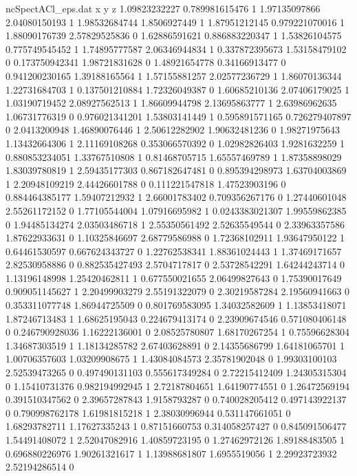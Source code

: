\begin{filecontents}{ncSpectACl_eps.dat}
x y z
1.09823232227 0.789981615476 1
1.97135097866 2.04080150193 1
1.98532684744 1.8506927449 1
1.87951212145 0.979221070016 1
1.88090176739 2.57829525836 0
1.62886591621 0.886883220347 1
1.53826104575 0.775749545452 1
1.74895777587 2.06346944834 1
0.337872395673 1.53158479102 0
0.173750942341 1.98721831628 0
1.48921654778 0.34166913477 0
0.941200230165 1.39188165564 1
1.57155881257 2.02577236729 1
1.86070136344 1.22731684703 1
0.137501210884 1.72326049387 0
1.60685210136 2.07406179025 1
1.03190719452 2.08927562513 1
1.86609944798 2.13695863777 1
2.63986962635 1.06731776319 0
0.976021341201 1.53803141449 1
0.595891571165 0.726279407897 0
2.0413200948 1.46890076446 1
2.50612282902 1.90632481236 0
1.98271975643 1.13432664306 1
2.11169108268 0.353066570392 0
1.02982826403 1.9281632259 1
0.880853234051 1.33767510808 1
0.81468705715 1.65557469789 1
1.87358898029 1.83039780819 1
2.59435177303 0.867182647481 0
0.895394298973 1.63704003869 1
2.20948109219 2.44426601788 0
0.111221547818 1.47523903196 0
0.884464385177 1.59407212932 1
2.66001783402 0.709356267176 0
1.27440601048 2.55261172152 0
1.77105544004 1.07916695982 1
0.0243383021307 1.99559862385 0
1.94485134274 2.03503486718 1
2.55350561492 2.52635549544 0
2.33963357586 1.87622933631 0
1.10325846697 2.68779586988 0
1.72368102911 1.93647950122 1
0.64461530597 0.667624343727 0
1.22762538341 1.88361024443 1
1.37469171657 2.82530958886 0
0.882535427493 2.5704717817 0
2.53728542291 1.64244243714 0
1.13196148998 1.25420462811 1
0.677550021655 2.06499827643 0
1.75390017649 0.909051145627 1
2.20499903279 2.55191322079 0
2.30219587284 2.19560941663 0
0.353311077748 1.86944725509 0
0.801769583095 1.34032582609 1
1.13853418071 1.87246713483 1
1.68625195043 0.224679413174 0
2.23909674546 0.571080406148 0
0.246790928036 1.16222136001 0
2.08525780807 1.68170267254 1
0.75596628304 1.34687303519 1
1.18134285782 2.67403628891 0
2.14355686799 1.64181065701 1
1.00706357603 1.03209908675 1
1.43084084573 2.35781902048 0
1.99303100103 2.52539473265 0
0.497490131103 0.555617349284 0
2.72215412409 1.24305315304 0
1.15410731376 0.982194992945 1
2.72187804651 1.64190774551 0
1.26472569194 0.391510347562 0
2.39657287843 1.9158793287 0
0.740028205412 0.497143922137 0
0.790998762178 1.61981815218 1
2.38030996944 0.531147661051 0
1.68293782711 1.17627335243 1
0.87151660753 0.314058257427 0
0.845091506477 1.54491408072 1
2.52047082916 1.40859723195 0
1.27462972126 1.89188483505 1
0.696880226976 1.90261321617 1
1.13988681807 1.6955519056 1
2.29923723932 2.52194286514 0

\end{filecontents}
